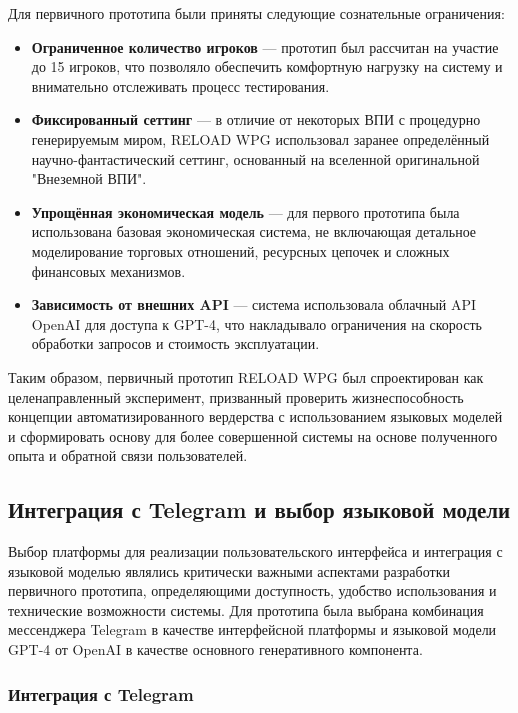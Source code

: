Для первичного прототипа были приняты следующие сознательные ограничения:

\begin{itemize}
    \item \textbf{Ограниченное количество игроков} — прототип был рассчитан на участие до 15 игроков, что позволяло обеспечить комфортную нагрузку на систему и внимательно отслеживать процесс тестирования.

    \item \textbf{Фиксированный сеттинг} — в отличие от некоторых ВПИ с процедурно генерируемым миром, RELOAD WPG использовал заранее определённый научно-фантастический сеттинг, основанный на вселенной оригинальной "{}Внеземной ВПИ"{}.

    \item \textbf{Упрощённая экономическая модель} — для первого прототипа была использована базовая экономическая система, не включающая детальное моделирование торговых отношений, ресурсных цепочек и сложных финансовых механизмов.

    \item \textbf{Зависимость от внешних API} — система использовала облачный API OpenAI для доступа к GPT-4, что накладывало ограничения на скорость обработки запросов и стоимость эксплуатации.
\end{itemize}

Таким образом, первичный прототип RELOAD WPG был спроектирован как целенаправленный эксперимент, призванный проверить жизнеспособность концепции автоматизированного вердерства с использованием языковых моделей и сформировать основу для более совершенной системы на основе полученного опыта и обратной связи пользователей.

\subsection{Интеграция с Telegram и выбор языковой модели}

Выбор платформы для реализации пользовательского интерфейса и интеграция с языковой моделью являлись критически важными аспектами разработки первичного прототипа, определяющими доступность, удобство использования и технические возможности системы. Для прототипа была выбрана комбинация мессенджера Telegram в качестве интерфейсной платформы и языковой модели GPT-4 от OpenAI в качестве основного генеративного компонента.

\subsubsection{Интеграция с Telegram}

